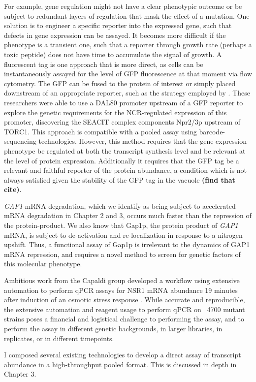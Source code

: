 For example, gene regulation might not have a
clear phenotypic outcome or be subject to redundant layers of
regulation that mask the effect of a mutation. One solution is to
engineer a specific reporter into the expressed gene, such that
defects in gene expression can be assayed. It becomes more difficult
if the phenotype is a transient one, such that a reporter through
growth rate (perhaps a toxic peptide) does not have time to accumulate
the signal of growth. A fluorescent tag is one approach that is more
direct, as cells can be instantaneously assayed for the
level of GFP fluorescence at that moment via flow cytometry. The GFP
can be fused to the protein of interest or simply placed downstream of
an appropriate reporter, such as the strategy employed by 
\cite{neklesa2009genome}. 
These researchers were able to use a DAL80 promoter upstream of a GFP
reporter to explore the genetic requirements for the NCR-regulated
expression of this promoter, discovering the SEACIT complex components
Npr2/3p upstream of TORC1. 
This approach is compatible with a pooled assay using
barcode-sequencing technologies. 
However, this method requires that the gene
expression phenotype be regulated at both the transcript synthesis
level and be relevant at the level of protein expression. Additionally
it requires that the GFP tag be a relevant and faithful reporter of
the protein abundance, a condition which is not always satisfied given
the stability of the GFP tag in the vacuole \textbf{(find that cite)}.


\textit{GAP1} mRNA degradation, which we identify as
being subject to accelerated mRNA degradation in Chapter 2 and 3,
occurs much faster than the repression of the protein-product. We also
know that Gap1p, the protein product of \textit{GAP1} mRNA, is subject to
de-activation and re-localization in response to a nitrogen upshift.
Thus, a functional assay of Gap1p is irrelevant to the dynamics of
GAP1 mRNA repression, and requires a novel method to screen for
genetic factors of this molecular phenotype.  

Ambitious work from the
Capaldi group developed a workflow using extensive automation to
perform qPCR assays for NSR1 mRNA abundance 19 minutes after induction
of an osmotic stress response 
\parencite{worley2016genome}. While accurate and
reproducible, the extensive automation and reagent usage to perform
qPCR on ~4700 mutant strains poses a financial and logistical
challenge to performing the assay, and to perform the assay in
different genetic backgrounds, in larger libraries, in replicates, or
in different timepoints.  

I composed several existing technologies \parencite{hanely2013} to
develop a direct assay of transcript abundance in a high-throughput
pooled format. This is discussed in depth in Chapter 3. 

